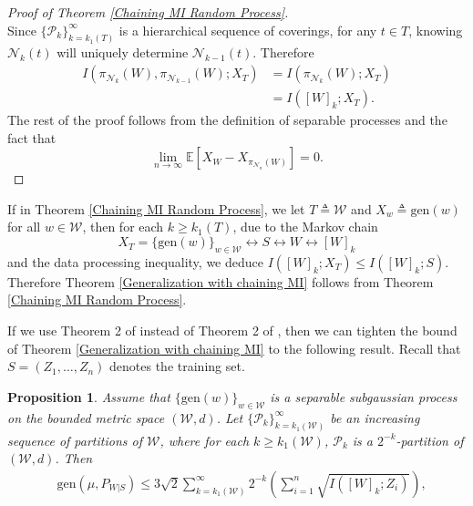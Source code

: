\documentclass{article}
\newtheorem{proposition}{Proposition}
\newcommand{\E}{\mathbb{E}}
\newcommand{\pa}{\mathcal{P}}
\begin{document}
\begin{proof}[Proof of Theorem \ref{Chaining MI Random Process}]
\begin{equation}
\end{equation}
Since $\{\pa_k\}_{k=k_1(T)}^{\infty}$ is a hierarchical sequence of coverings, for any $t\in T$, knowing $\mathcal{N}_k(t)$ will uniquely determine $\mathcal{N}_{k-1}(t)$. Therefore
\begin{align}
I\left(\pi_{\mathcal{N}_k}(W),\pi_{\mathcal{N}_{k-1}}(W);X_{T}\right)&=I\left(\pi_{\mathcal{N}_k}(W);X_{T}\right)\nonumber\\
							                                         &= I\left([W]_k;X_{T}\right).\nonumber
\end{align}
The rest of the proof follows from the definition of separable processes and the fact that 
\begin{equation}
    \lim_{n\to \infty} \E \left[X_W-X_{\pi_{\mathcal{N}_n}(W)}\right]=0.\nonumber
\end{equation}
\end{proof}
If in Theorem \ref{Chaining MI Random Process}, we let $T\triangleq \mathcal{W}$ and $X_w\triangleq \mathrm{gen}(w)$ for all $w\in \mathcal{W}$, then for each $k\geq k_1(T)$, due to the Markov chain 
\begin{equation}\label{the Markov chain}
X_T=\{\mathrm{gen}(w)\}_{w\in \mathcal{W}}\leftrightarrow S \leftrightarrow W \leftrightarrow [W]_k
\end{equation}
and the data processing inequality, we deduce $I([W]_k;X_T)\leq I([W]_k;S)$. Therefore Theorem \ref{Generalization with chaining MI} follows from Theorem \ref{Chaining MI Random Process}. 

If we use Theorem 2 of \cite{bu2019tightening} instead of Theorem 2 of \cite{xu2017information}, then we can tighten the bound of Theorem \ref{Generalization with chaining MI} to the following result. Recall that $S=(Z_1,\dots,Z_n)$ denotes the training set.

\begin{proposition} Assume that $\{\mathrm{gen}(w)\}_{w\in \mathcal{W}}$ is a separable subgaussian process on the bounded metric space $(\mathcal{W},d)$. Let $\{\mathcal{P}_k\}_{k=k_1(\mathcal{W})}^{\infty}$ be an increasing sequence of partitions of $\mathcal{W}$, where for each $k\geq k_1(\mathcal{W})$, $\mathcal{P}_k$ is a $ 2^{-k}$-partition of $(\mathcal{W},d)$. Then 
     	\begin{align}
&\mathrm{gen}(\mu, P_{W|S})\leq 3\sqrt{2} \sum_{k=k_1(\mathcal{W})}^{\infty}2^{-k}\left(\sum_{i=1}^n\sqrt{I([W]_k;Z_i)}\right),
\end{align}
\end{proposition}
\end{document}
